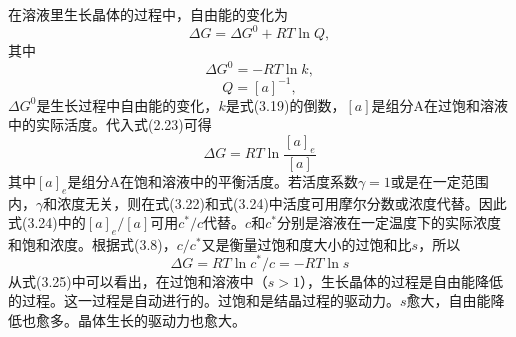在溶液里生长晶体的过程中，自由能的变化为
\begin{equation}
\Delta G=\Delta G^0+RT\ln Q,
\end{equation}
其中
$$\Delta G^0=-RT\ln k,$$
$$Q=[a]^{-1},$$
$\Delta G^0$是生长过程中自由能的变化，$k$是式(3.19)的倒数，$[a]$是组分A在过饱和溶液中的实际活度。代入式(2.23)可得
\begin{equation}
\Delta G=RT\ln\frac{[a]_e}{[a]}
\end{equation}
其中$[a]_e$是组分A在饱和溶液中的平衡活度。若活度系数$\gamma=1$或是在一定范围内，$\gamma$和浓度无关，则在式(3.22)和式(3.24)中活度可用摩尔分数或浓度代替。因此式(3.24)中的$[a]_e/[a]$可用$c^*/c$代替。$c$和$c^*$分别是溶液在一定温度下的实际浓度和饱和浓度。根据式(3.8)，$c/c^*$又是衡量过饱和度大小的过饱和比$s$，所以
\begin{equation}
\Delta G=RT\ln c^*/c = -RT\ln s
\end{equation}
从式(3.25)中可以看出，在过饱和溶液中（$s>1$），生长晶体的过程是自由能降低的过程。这一过程是自动进行的。过饱和是结晶过程的驱动力。$s$愈大，自由能降低也愈多。晶体生长的驱动力也愈大。
